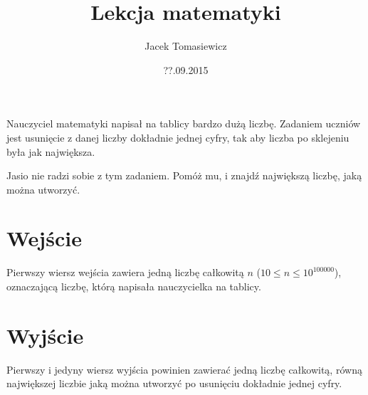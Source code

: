 \documentclass[zad,zawodnik,utf8]{sinol}
\title{Lekcja matematyki}
\date{??.09.2015}
\author{Jacek Tomasiewicz}
\begin{document}
  \begin{tasktext}%
   Nauczyciel matematyki napisał na tablicy bardzo dużą liczbę. Zadaniem uczniów jest usunięcie z danej liczby dokładnie jednej cyfry, tak aby liczba po sklejeniu była jak największa.

Jasio nie radzi sobie z tym zadaniem. Pomóż mu, i znajdź największą liczbę, jaką można utworzyć.

  \section{Wejście}
    	Pierwszy wiersz wejścia zawiera jedną liczbę całkowitą $n$ ($10 \leq n \leq 10^{100000}$), oznaczającą liczbę, którą napisała nauczycielka na tablicy.

  \section{Wyjście}
   Pierwszy i jedyny wiersz wyjścia powinien zawierać jedną liczbę całkowitą, równą największej liczbie jaką można utworzyć po usunięciu dokładnie jednej cyfry.

  \makecompactexample


  \end{tasktext}
\end{document}
